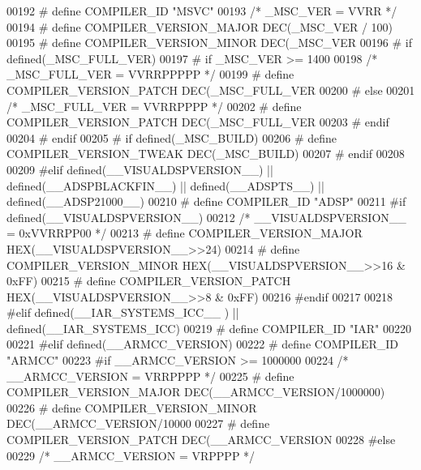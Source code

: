 \begin{DoxyCode}
{{{{{{{{{{{{{{{{{{{{{{{00192 \textcolor{preprocessor}{# define COMPILER\_ID "MSVC"}
00193   \textcolor{comment}{/* \_MSC\_VER = VVRR */}
00194 \textcolor{preprocessor}{# define COMPILER\_VERSION\_MAJOR DEC(\_MSC\_VER / 100)}
00195 \textcolor{preprocessor}{# define COMPILER\_VERSION\_MINOR DEC(\_MSC\_VER %
00196 \textcolor{preprocessor}{# if defined(\_MSC\_FULL\_VER)}
00197 \textcolor{preprocessor}{#  if \_MSC\_VER >= 1400}
00198     \textcolor{comment}{/* \_MSC\_FULL\_VER = VVRRPPPPP */}
00199 \textcolor{preprocessor}{#   define COMPILER\_VERSION\_PATCH DEC(\_MSC\_FULL\_VER %
00200 \textcolor{preprocessor}{#  else}
00201     \textcolor{comment}{/* \_MSC\_FULL\_VER = VVRRPPPP */}
00202 \textcolor{preprocessor}{#   define COMPILER\_VERSION\_PATCH DEC(\_MSC\_FULL\_VER %
00203 \textcolor{preprocessor}{#  endif}
00204 \textcolor{preprocessor}{# endif}
00205 \textcolor{preprocessor}{# if defined(\_MSC\_BUILD)}
00206 \textcolor{preprocessor}{#  define COMPILER\_VERSION\_TWEAK DEC(\_MSC\_BUILD)}
00207 \textcolor{preprocessor}{# endif}
00208 
00209 \textcolor{preprocessor}{#elif defined(\_\_VISUALDSPVERSION\_\_) || defined(\_\_ADSPBLACKFIN\_\_) || defined(\_\_ADSPTS\_\_) ||
       defined(\_\_ADSP21000\_\_)}
00210 \textcolor{preprocessor}{# define COMPILER\_ID "ADSP"}
00211 \textcolor{preprocessor}{#if defined(\_\_VISUALDSPVERSION\_\_)}
00212   \textcolor{comment}{/* \_\_VISUALDSPVERSION\_\_ = 0xVVRRPP00 */}
00213 \textcolor{preprocessor}{# define COMPILER\_VERSION\_MAJOR HEX(\_\_VISUALDSPVERSION\_\_>>24)}
00214 \textcolor{preprocessor}{# define COMPILER\_VERSION\_MINOR HEX(\_\_VISUALDSPVERSION\_\_>>16 & 0xFF)}
00215 \textcolor{preprocessor}{# define COMPILER\_VERSION\_PATCH HEX(\_\_VISUALDSPVERSION\_\_>>8  & 0xFF)}
00216 \textcolor{preprocessor}{#endif}
00217 
00218 \textcolor{preprocessor}{#elif defined(\_\_IAR\_SYSTEMS\_ICC\_\_ ) || defined(\_\_IAR\_SYSTEMS\_ICC)}
00219 \textcolor{preprocessor}{# define COMPILER\_ID "IAR"}
00220 
00221 \textcolor{preprocessor}{#elif defined(\_\_ARMCC\_VERSION)}
00222 \textcolor{preprocessor}{# define COMPILER\_ID "ARMCC"}
00223 \textcolor{preprocessor}{#if \_\_ARMCC\_VERSION >= 1000000}
00224   \textcolor{comment}{/* \_\_ARMCC\_VERSION = VRRPPPP */}
00225 \textcolor{preprocessor}{  # define COMPILER\_VERSION\_MAJOR DEC(\_\_ARMCC\_VERSION/1000000)}
00226 \textcolor{preprocessor}{  # define COMPILER\_VERSION\_MINOR DEC(\_\_ARMCC\_VERSION/10000 %
00227 \textcolor{preprocessor}{  # define COMPILER\_VERSION\_PATCH DEC(\_\_ARMCC\_VERSION     %
00228 \textcolor{preprocessor}{#else}
00229   \textcolor{comment}{/* \_\_ARMCC\_VERSION = VRPPPP */}
}}}}}}}}}}}}}}}}}}}}}}}}}}}}
\end{DoxyCode}
